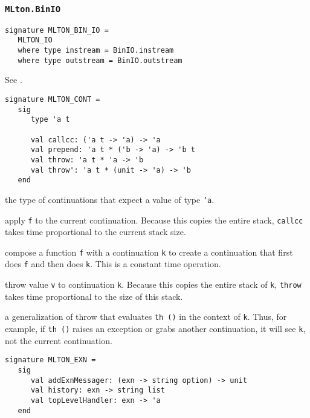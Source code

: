 \subsubsection{{\tt MLton.BinIO}}

\begin{verbatim}
signature MLTON_BIN_IO =
   MLTON_IO
   where type instream = BinIO.instream
   where type outstream = BinIO.outstream
\end{verbatim}

See .


\begin{verbatim}
signature MLTON_CONT =
   sig
      type 'a t

      val callcc: ('a t -> 'a) -> 'a
      val prepend: 'a t * ('b -> 'a) -> 'b t
      val throw: 'a t * 'a -> 'b
      val throw': 'a t * (unit -> 'a) -> 'b
   end
\end{verbatim}

\begin{description}

the type of continuations that expect a value of type {\tt 'a}.

apply {\tt f} to the current continuation.  Because this copies the
entire stack, {\tt callcc} takes time proportional to the current
stack size.

compose a function {\tt f} with a continuation {\tt k} to create a
continuation that first does {\tt f} and then does {\tt k}.  This
is a constant time operation.

throw value {\tt v} to continuation {\tt k}.  Because this copies the
entire stack of {\tt k}, {\tt throw} takes time proportional to the
size of this stack.

a generalization of throw that evaluates {\tt th ()} in the context
of {\tt k}.  Thus, for example, if {\tt th ()} raises an exception or
grabs another continuation, it will see {\tt k}, not the current
continuation.

\end{description}

\begin{verbatim}
signature MLTON_EXN =
   sig
      val addExnMessager: (exn -> string option) -> unit
      val history: exn -> string list
      val topLevelHandler: exn -> 'a
   end
\end{verbatim}

